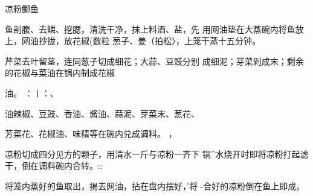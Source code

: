 \begin{recipe}{凉粉鲫鱼}

\ingredients



\cooking

\step 	鱼剖腹、去鳞、挖腮，清洗干净，抹上料酒、盐，先 用网油垫在大蒸碗内将鱼放上，网油抄拢，放花椒(数粒 葱子、姜（拍松〉，上笼干蒸十五分钟。

\step 	芹菜去叶留茎，连同葱子切成细花；大蒜、豆豉分别 成细泥；芽菜剁成末；剩余的花椒与菜油在锅内制成花椒

油。	：丨：、

\step 	油辣椒、豆豉、香油、酱油、蒜泥、芽菜末、葱花、

芳菜花、花椒油、味精等在碗内兑成调料。	，

\step 	凉粉切成四分见方的颗子，用清水一斤与凉粉一齐下 锅^水烧开时即将凉粉打起滤干，倒在调料碗内合转。::

\step 	将笼内蒸好的鱼取出，揭去网油，拈在盘内摆好，’将 -合好的凉粉倒在鱼上即成。

\notes

\notes

\end{recipe}


